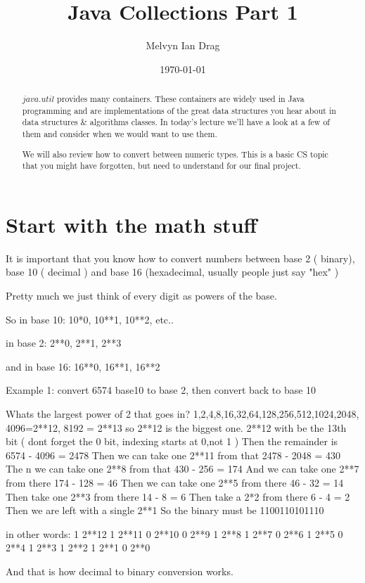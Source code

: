 \documentclass[10pt]{article}
\title{Java Collections Part 1}
\author{
	Melvyn Ian Drag
}
\date{\today}
\begin{document}
\maketitle

\begin{abstract}
$java.util$ provides many containers. These containers are widely used in Java programming and are implementations of the great data structures you hear about in data structures \& algorithms classes. In today's lecture we'll have a look at a few of them and consider when we would want to use them.

We will also review how to convert between numeric types. This is a basic CS
topic that you might have forgotten, but need to understand for our final
project.
\end{abstract}

\section{Start with the math stuff}
It is important that you know how to convert numbers between base 2 ( binary),
base 10 ( decimal ) and base 16 (hexadecimal, usually people just say "hex" )

Pretty much we just think of every digit as powers of the base.

So in base 10:
10*0, 10**1,  10**2, etc..

in base 2:
2**0, 2**1, 2**3

and in base 16:
16**0, 16**1, 16**2


Example 1:
convert 6574 base10  to base 2, then convert back to base 10

Whats the largest power of 2 that goes in?
1,2,4,8,16,32,64,128,256,512,1024,2048, 4096=2**12, 8192 = 2**13 so 2**12 is the
biggest one. 2**12 with be the 13th bit ( dont forget the 0 bit, indexing starts
at 0,not 1 )
Then the remainder is 6574 - 4096 = 2478
Then we can take one 2**11 from that 2478 - 2048 = 430
The n we can take one 2**8 from that 430 - 256 = 174
And we can take one 2**7 from there 174 - 128 = 46
Then we can take one 2**5 from there 46 - 32 = 14
Then take one 2**3 from there 14 - 8 = 6
Then take a 2*2 from there 6 - 4 = 2
Then we are left with a single 2**1
So the binary must be 
1100110101110

in other words:
1 2**12
1 2**11
0 2**10
0 2**9
1 2**8
1 2**7
0 2**6
1 2**5
0 2**4
1 2**3
1 2**2
1 2**1
0 2**0

And that is how decimal to binary conversion works.
\end{document}
